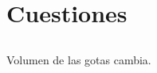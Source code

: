\section{Cuestiones}

\subsection{}

\subsection{}

\subsection{}

\subsection{}

\subsection{}

Volumen de las gotas cambia.